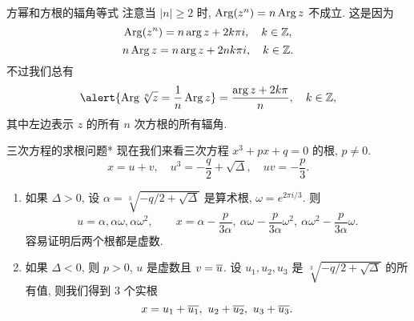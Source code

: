 \begin{frame}{方幂和方根的辐角等式}
	\onslide<+->
	注意当 $|n|\ge 2$ 时, \alert{$\operatorname{Arg}(z^n)=n\operatorname{Arg} z$ 不成立}.
	\onslide<+->
	这是因为
	\[\operatorname{Arg}(z^n)=n\arg z+2k\pi i,\quad k\in{\mathbb{Z}},\]
	\[n\operatorname{Arg} z=n\arg z+2nk\pi i,\quad k\in{\mathbb{Z}}.\]
	\onslide<+->
	不过我们总有
	\[\alert{\Arg \sqrt[n]z=\dfrac1n\Arg z}=\dfrac{\arg z+2k\pi}n,\quad k\in\BZ,\]
	\onslide<+->
	其中左边表示 $z$ 的所有 $n$ 次方根的所有辐角.
\end{frame}
	

\begin{frame}{三次方程的求根问题*}
	\onslide<+->
	现在我们来看三次方程 $x^3+px+q=0$ 的根, $p\neq 0$.
	\onslide<+->
	\[x=u+v,\quad u^3=-\frac q2+\sqrt{\Delta},\quad uv=-\frac p3.\]
	\begin{enumerate}
		\item 如果 $\Delta>0$, 设 $\alpha=\sqrt[3]{-q/2+\sqrt{\Delta}}$ 是算术根, $\omega=e^{2\pi i/3}$.
			\onslide<+->
			则
			\[u=\alpha,\alpha\omega,\alpha\omega^2,\qquad
			x=\alpha-\frac p{3\alpha},\ \alpha\omega-\frac p{3\alpha} \omega^2,\ \alpha\omega^2-\frac p{3\alpha} \omega.\]
			\onslide<+->
			容易证明后两个根都是虚数.
		\item 如果 $\Delta<0$, 则 $p>0$, $u$ 是虚数且 $v=\overline u$.
			\onslide<+->设 $u_1,u_2,u_3$ 是 $\sqrt[3]{-q/2+\sqrt{\Delta}}$ 的所有值,
			\onslide<+->
			则我们得到 $3$ 个实根
			\[x=u_1+\ov{u_1},\ u_2+\ov{u_2},\ u_3+\ov{u_3}.\]
	\end{enumerate}
\end{frame}

